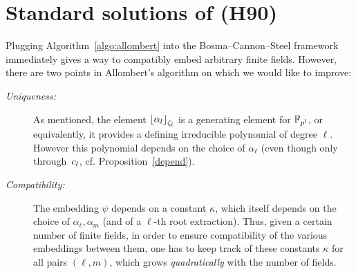\documentclass{sig-alternate}
\begin{document}
\section{Standard solutions of (H90)}
\label{sec:compatibleH90}

Plugging Algorithm~\ref{algo:allombert} into the Bosma--Cannon--Steel
framework immediately gives a way to compatibly embed arbitrary finite
fields. %
However, there are two points in Allombert's algorithm on which we
would like to improve:
\begin{description}
\item[\emph{Uniqueness:}] As mentioned, the element $\left\lfloor \alpha_{l} \right\rfloor_{\zeta_l}$ is a generating element for $\mathbb{F}_{p^{l}}$,
or equivalently, it provides a defining irreducible polynomial of degree $\ell$.
However this polynomial depends on the choice of $\alpha_{\ell}$
(even though only through~$c_l$, cf. Proposition~\ref{depend}).
\item[\emph{Compatibility:}] The embedding $\psi$ depends on a constant $\kappa$,
which itself depends on the choice of $\alpha_\ell,\alpha_m$ (and of a $\ell$-th root extraction).
Thus, given a certain number of finite fields, in order to ensure compatibility of the various
embeddings between them, one has to keep track of these constants $\kappa$
for all pairs $(\ell,m)$,
which grows \emph{quadratically} with the number of fields.
\end{description}
\end{document}
